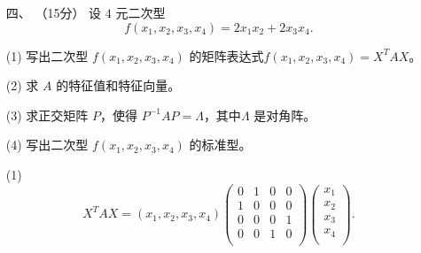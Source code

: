 \begin{enumerate}[1~]
\item[四、]（15分）
设 $4$ 元二次型\[
f \left( x _ { 1 } , x _ { 2 } , x _ { 3 } , x _ { 4 } \right) = 2 x _ { 1 } x _ { 2 } + 2 x _ { 3 } x _ { 4 }.
\]

(1) 写出二次型 $f(x_1, x_2, x_3, x_4)$ 的矩阵表达式$ f(x_1, x_2, x_3, x_4) = X^T AX$。

(2) 求 $A$ 的特征值和特征向量。

(3) 求正交矩阵 $P$，使得 $P^{-1}AP = \Lambda$，其中$\Lambda$ 是对角阵。

(4) 写出二次型 $f(x_1, x_2, x_3, x_4)$ 的标准型。

\begin{solution}
(1) 
$$
X^T A X=\left( x_1,x_2,x_3,x_4 \right) \left( \begin{matrix}
	0&		1&		0&		0\\
	1&		0&		0&		0\\
	0&		0&		0&		1\\
	0&		0&		1&		0\\
\end{matrix} \right) \left( \begin{array}{c}
	x_1\\
	x_2\\
	x_3\\
	x_4\\
\end{array} \right).
$$


\end{solution}
\end{enumerate}
